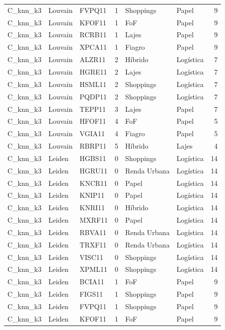\begin{tabular}{lllrllr}
C\_knn\_k3 & Louvain & FVPQ11 & 1 & Shoppings & Papel & 9 \\
C\_knn\_k3 & Louvain & KFOF11 & 1 & FoF & Papel & 9 \\
C\_knn\_k3 & Louvain & RCRB11 & 1 & Lajes & Papel & 9 \\
C\_knn\_k3 & Louvain & XPCA11 & 1 & Fiagro & Papel & 9 \\
C\_knn\_k3 & Louvain & ALZR11 & 2 & Híbrido & Logística & 7 \\
C\_knn\_k3 & Louvain & HGRE11 & 2 & Lajes & Logística & 7 \\
C\_knn\_k3 & Louvain & HSML11 & 2 & Shoppings & Logística & 7 \\
C\_knn\_k3 & Louvain & PQDP11 & 2 & Shoppings & Logística & 7 \\
C\_knn\_k3 & Louvain & TEPP11 & 3 & Lajes & Papel & 7 \\
C\_knn\_k3 & Louvain & HFOF11 & 4 & FoF & Papel & 5 \\
C\_knn\_k3 & Louvain & VGIA11 & 4 & Fiagro & Papel & 5 \\
C\_knn\_k3 & Louvain & RBRP11 & 5 & Híbrido & Lajes & 4 \\
C\_knn\_k3 & Leiden & HGBS11 & 0 & Shoppings & Logística & 14 \\
C\_knn\_k3 & Leiden & HGRU11 & 0 & Renda Urbana & Logística & 14 \\
C\_knn\_k3 & Leiden & KNCR11 & 0 & Papel & Logística & 14 \\
C\_knn\_k3 & Leiden & KNIP11 & 0 & Papel & Logística & 14 \\
C\_knn\_k3 & Leiden & KNRI11 & 0 & Híbrido & Logística & 14 \\
C\_knn\_k3 & Leiden & MXRF11 & 0 & Papel & Logística & 14 \\
C\_knn\_k3 & Leiden & RBVA11 & 0 & Renda Urbana & Logística & 14 \\
C\_knn\_k3 & Leiden & TRXF11 & 0 & Renda Urbana & Logística & 14 \\
C\_knn\_k3 & Leiden & VISC11 & 0 & Shoppings & Logística & 14 \\
C\_knn\_k3 & Leiden & XPML11 & 0 & Shoppings & Logística & 14 \\
C\_knn\_k3 & Leiden & BCIA11 & 1 & FoF & Papel & 9 \\
C\_knn\_k3 & Leiden & FIGS11 & 1 & Shoppings & Papel & 9 \\
C\_knn\_k3 & Leiden & FVPQ11 & 1 & Shoppings & Papel & 9 \\
C\_knn\_k3 & Leiden & KFOF11 & 1 & FoF & Papel & 9 \\

\end{tabular}
